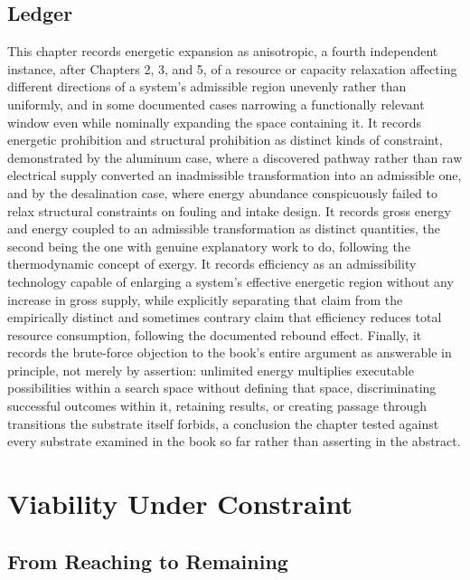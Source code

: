 \documentclass[11pt]{book}
\begin{document}
\section{Ledger}

This chapter records energetic expansion as anisotropic, a fourth independent instance, after Chapters 2, 3, and 5, of a resource or capacity relaxation affecting different directions of a system's admissible region unevenly rather than uniformly, and in some documented cases narrowing a functionally relevant window even while nominally expanding the space containing it. It records energetic prohibition and structural prohibition as distinct kinds of constraint, demonstrated by the aluminum case, where a discovered pathway rather than raw electrical supply converted an inadmissible transformation into an admissible one, and by the desalination case, where energy abundance conspicuously failed to relax structural constraints on fouling and intake design. It records gross energy and energy coupled to an admissible transformation as distinct quantities, the second being the one with genuine explanatory work to do, following the thermodynamic concept of exergy. It records efficiency as an admissibility technology capable of enlarging a system's effective energetic region without any increase in gross supply, while explicitly separating that claim from the empirically distinct and sometimes contrary claim that efficiency reduces total resource consumption, following the documented rebound effect. Finally, it records the brute-force objection to the book's entire argument as answerable in principle, not merely by assertion: unlimited energy multiplies executable possibilities within a search space without defining that space, discriminating successful outcomes within it, retaining results, or creating passage through transitions the substrate itself forbids, a conclusion the chapter tested against every substrate examined in the book so far rather than asserting in the abstract.


\chapter{Viability Under Constraint}

\section{From Reaching to Remaining}
\end{document}
